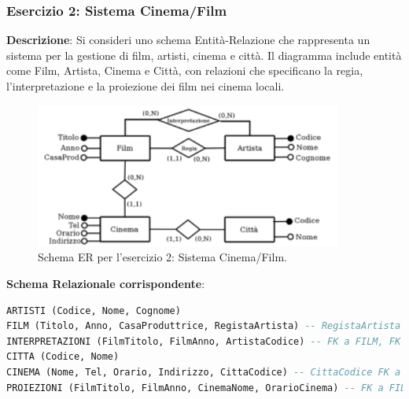 \subsubsection{Esercizio 2: Sistema Cinema/Film}
\textbf{Descrizione}: Si consideri uno schema Entità-Relazione che rappresenta un sistema per la gestione di film, artisti, cinema e città. Il diagramma include entità come Film, Artista, Cinema e Città, con relazioni che specificano la regia, l'interpretazione e la proiezione dei film nei cinema locali.
\begin{figure}[h!]
    \centering
    \includegraphics[width=0.9\textwidth]{immagini/er_esercizio_2_cinema_film.png} %
    \caption{Schema ER per l'esercizio 2: Sistema Cinema/Film.}
    \label{fig:er_esercizio_2_cinema_film}
\end{figure}

\textbf{Schema Relazionale corrispondente}:
\begin{lstlisting}[language=SQL]
ARTISTI (Codice, Nome, Cognome)
FILM (Titolo, Anno, CasaProduttrice, RegistaArtista) -- RegistaArtista FK a ARTISTI
INTERPRETAZIONI (FilmTitolo, FilmAnno, ArtistaCodice) -- FK a FILM, FK a ARTISTI
CITTA (Codice, Nome)
CINEMA (Nome, Tel, Orario, Indirizzo, CittaCodice) -- CittaCodice FK a CITTA
PROIEZIONI (FilmTitolo, FilmAnno, CinemaNome, OrarioCinema) -- FK a FILM, FK a CINEMA
\end{lstlisting}

